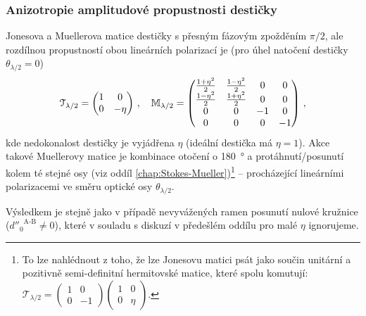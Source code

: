 \subsubsection*{Anizotropie amplitudové propustnosti destičky}
Jonesova a Muellerova matice destičky s přesným fázovým zpožděním $\pi/2$, ale rozdílnou propustností obou lineárních polarizací je (pro úhel natočení destičky $\theta_{\lambda/2}=0$)
\begin{equation}
    \mathcal{T}_{\lambda/2} = \begin{pmatrix} 1&0 \\ 0&-\eta \end{pmatrix} \,, \quad
    \mathbb{M}_{\lambda/2} = \begin{pmatrix} \frac{1+\eta^2}{2}&\frac{1-\eta^2}{2}&0&0 \\ \frac{1-\eta^2}{2}&\frac{1+\eta^2}{2}&0&0 \\ 0&0&-1&0 \\ 0&0&0&-1 \end{pmatrix} \,,
\end{equation}
kde nedokonalost destičky je vyjádřena $\eta$ (ideální destička má $\eta=1$).
Akce takové Muellerovy matice je kombinace otočení o \SI{180}{\degree} a protáhnutí/posunutí kolem té stejné osy (viz oddíl \ref{chap:Stokes-Mueller})\footnote{To lze nahlédnout z toho, že lze Jonesovu matici psát jako součin unitární a pozitivně semi-definitní hermitovské matice, které spolu komutují: $\mathcal{T}_{\lambda/2} = \begin{pmatrix} 1&0\\0&-1 \end{pmatrix} \begin{pmatrix} 1&0\\0&\eta \end{pmatrix}$.} -- procházející lineárními polarizacemi ve směru optické osy $\theta_{\lambda/2}$.

Výsledkem je stejně jako v případě nevyvážených ramen posunutí nulové kružnice (${d''_0}^\textrm{A-B}\neq0$), které v souladu s diskuzí v předešlém oddílu pro malé $\eta$ ignorujeme.

